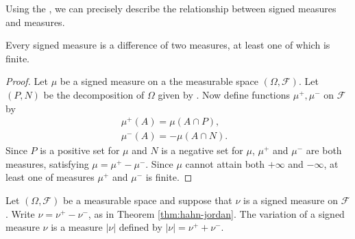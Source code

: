 Using the , we can precisely describe the relationship between signed measures and measures.
\begin{theorem}
\label{thm:hahn-jordan}
Every signed measure is a difference of two measures, at least one of which is finite.
\end{theorem}
\begin{proof}
Let $\mu$ be a signed measure on a the measurable space $(\Omega, \mathcal{F})$. Let $(P, N)$ be the decomposition of $\Omega$ given by . Now define functions $\mu^+, \mu^-$ on $\mathcal{F}$ by
\begin{align*}
    \mu^+ (A) = \mu (A \cap P), & \\
    \mu^- (A) = -\mu (A \cap N).
\end{align*}
Since $P$ is a positive set for $\mu$ and $N$ is a negative set for $\mu$, $\mu^+$ and $\mu^-$ are both measures, satisfying $\mu = \mu^+ - \mu^-$. Since $\mu$ cannot attain both $+\infty$ and $-\infty$, at least one of measures $\mu^+$ and $\mu^-$ is finite.
\end{proof}

\begin{definition}
Let $(\Omega, \mathcal{F})$ be a measurable space and suppose that $\nu$ is a signed measure on $\mathcal{F}$. Write $\nu = \nu^{+} - \nu^{-}$, as in Theorem \ref{thm:hahn-jordan}. The variation of a signed measure $\nu$ is a measure $|\nu|$ defined by $|\nu| = \nu^{+} + \nu^{-}$.
\end{definition}